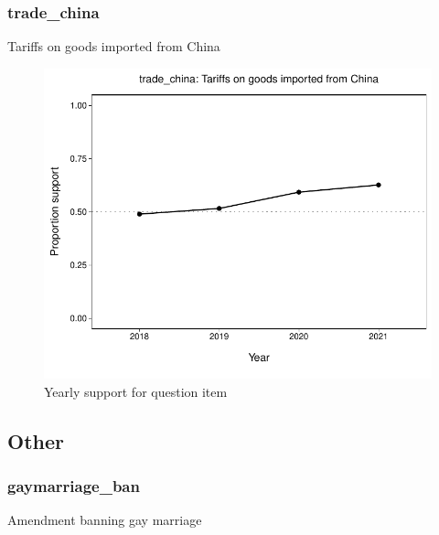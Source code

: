 \documentclass[
  12pt]{article}
\begin{document}
\hypertarget{trade_china}{%
\subsubsection{trade\_china}\label{trade_china}}

Tariffs on goods imported from China

\begin{figure}

{\centering \includegraphics{error-checking_files/figure-latex/unnamed-chunk-3-37} 

}

\caption{Yearly support for question item}\label{fig:unnamed-chunk-3-37}
\end{figure}

\newpage

\hypertarget{other}{%
\subsection{Other}\label{other}}

\hypertarget{gaymarriage_ban}{%
\subsubsection{gaymarriage\_ban}\label{gaymarriage_ban}}

Amendment banning gay marriage
\end{document}
